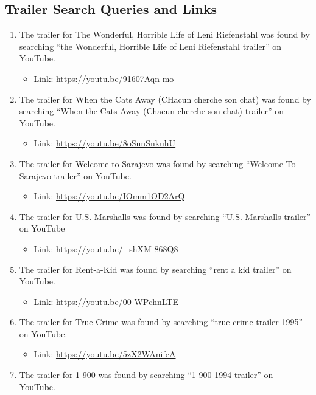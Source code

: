 \documentclass[12pt]{article}
\begin{document}
\subsection*{Trailer Search Queries and Links}
\begin{enumerate}
    \item The trailer for The Wonderful, Horrible Life of Leni Riefenstahl was found by searching ``the Wonderful, Horrible Life of Leni Riefenstahl trailer'' on YouTube.
    \begin{itemize}
        \item Link: \url{https://youtu.be/91607Aqn-mo}
    \end{itemize}
    \item The trailer for When the Cats Away (CHacun cherche son chat) was found by searching ``When the Cats Away (Chacun cherche son chat) trailer'' on YouTube.
    \begin{itemize}
        \item Link: \url{https://youtu.be/8oSunSnkuhU}
    \end{itemize}
    \item The trailer for Welcome to Sarajevo was found by searching ``Welcome To Sarajevo trailer'' on YouTube.
    \begin{itemize}
        \item Link: \url{https://youtu.be/IOmm1OD2ArQ}
    \end{itemize}
    \item The trailer for U.S. Marshalls was found by searching ``U.S. Marshalls trailer'' on YouTube
    \begin{itemize}
        \item Link: \url{https://youtu.be/_shXM-868Q8}
    \end{itemize}
    \item The trailer for Rent-a-Kid was found by searching ``rent a kid trailer'' on YouTube.
    \begin{itemize}
        \item Link: \url{https://youtu.be/00-WPchnLTE}
    \end{itemize}
    \item The trailer for True Crime was found by searching ``true crime trailer 1995'' on YouTube.
    \begin{itemize}
        \item Link: \url{https://youtu.be/5zX2WAnifeA}
    \end{itemize}
    \item The trailer for 1-900 was found by searching ``1-900 1994 trailer'' on YouTube.

\end{enumerate}
\end{document}
